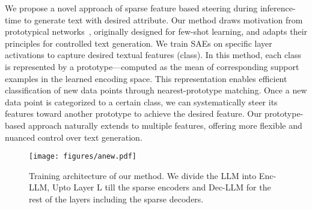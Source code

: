 
\par
 We propose a novel approach of sparse feature based steering during inference-time to generate text with desired attribute. Our method draws motivation from prototypical networks~\cite{snell2017prototypical}, originally designed for few-shot learning, and adapts their principles for controlled text generation. We train SAEs on specific layer activations to capture desired textual features (class). In this method, each class  is represented by a prototype—computed as the mean of corresponding support examples in the learned encoding space. This representation enables efficient classification of new data points through nearest-prototype matching. Once a new data point is categorized to a certain class, we can systematically steer its features toward another prototype to achieve the desired feature. Our prototype-based approach naturally extends to multiple features, offering more flexible and nuanced control over text generation.

\begin{figure*}[htbp]
\centering
  \texttt{[image: figures/anew.pdf]}
  \caption{Training architecture of our method. We divide the LLM  into Enc-LLM, Upto Layer L till the sparse encoders and Dec-LLM for the rest of the layers including the sparse decoders.
}
  \label{fig:entire}
\end{figure*}

